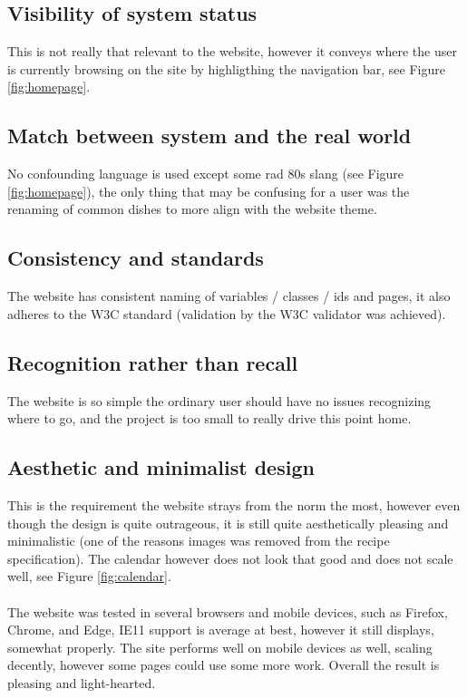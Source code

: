 \documentclass[a4paper]{scrartcl}
\begin{document}
\subsection{Visibility of system status}
This is not really that relevant to the website, however it conveys where the user
is currently browsing on the site by highligthing the navigation bar, see Figure \ref{fig:homepage}.
\subsection{Match between system and the real world}
No confounding language is used except some rad 80s slang (see Figure \ref{fig:homepage}),
the only thing that may be confusing for a user was the renaming of common dishes
to more align with the website theme.
\subsection{Consistency and standards}
The website has consistent naming of variables / classes / ids and pages, it also
adheres to the W3C standard (validation by the W3C validator was achieved).
\subsection{Recognition rather than recall}
The website is so simple the ordinary user should have no issues recognizing where to go,
and the project is too small to really drive this point home.
\subsection{Aesthetic and minimalist design}
This is the requirement the website strays from the norm the most, however
even though the design is quite outrageous, it is still quite aesthetically pleasing and
minimalistic (one of the reasons images was removed from the recipe specification).
The calendar however does not look that good and does not scale well, see Figure \ref{fig:calendar}.
\\\\
\noindent
The website was tested in several browsers and mobile devices, such as Firefox, Chrome, and Edge,
IE11 support is average at best, however it still displays, somewhat properly.
The site performs well on mobile devices as well, scaling decently, however some
pages could use some more work.
Overall the result is pleasing and light-hearted.
\end{document}
